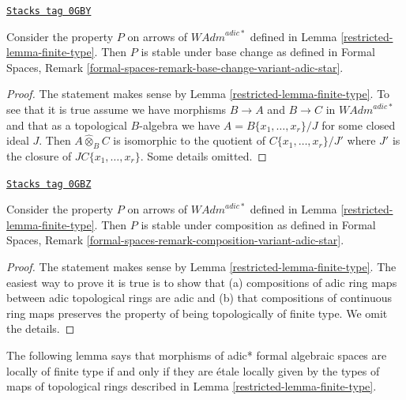 \begin{lemma}
\label{restricted-lemma-base-change-finite-type}
\href{https://stacks.math.columbia.edu/tag/0GBY}{\texttt{Stacks tag 0GBY}}

Consider the property $P$ on arrows of $\textit{WAdm}^{adic*}$ defined in
Lemma \ref{restricted-lemma-finite-type}. Then $P$ is stable under base change as
defined in Formal Spaces, Remark
\ref{formal-spaces-remark-base-change-variant-adic-star}.
\end{lemma}

\begin{proof}

The statement makes sense by Lemma \ref{restricted-lemma-finite-type}.
To see that it is true assume we have morphisms
$B \to A$ and $B \to C$ in $\textit{WAdm}^{adic*}$
and that as a topological $B$-algebra we have
$A = B\{x_1, \ldots, x_r\}/J$ for some closed ideal $J$.
Then $A \widehat{\otimes}_B C$ is isomorphic to the
quotient of $C\{x_1, \ldots, x_r\}/J'$ where
$J'$ is the closure of $JC\{x_1, \ldots, x_r\}$.
Some details omitted.
\end{proof}

\begin{lemma}
\label{restricted-lemma-composition-finite-type}
\href{https://stacks.math.columbia.edu/tag/0GBZ}{\texttt{Stacks tag 0GBZ}}

Consider the property $P$ on arrows of $\textit{WAdm}^{adic*}$ defined in
Lemma \ref{restricted-lemma-finite-type}. Then $P$ is stable under composition as
defined in Formal Spaces, Remark
\ref{formal-spaces-remark-composition-variant-adic-star}.
\end{lemma}

\begin{proof}

The statement makes sense by Lemma \ref{restricted-lemma-finite-type}.
The easiest way to prove it is true is to show that
(a) compositions of adic ring maps between adic topological rings
are adic and (b) that compositions of continuous ring maps
preserves the property of being topologically of finite type.
We omit the details.
\end{proof}

The following lemma says that morphisms of adic* formal algebraic spaces
are locally of finite type if and only if they are \'etale locally given
by the types of maps of topological rings described in
Lemma \ref{restricted-lemma-finite-type}.

